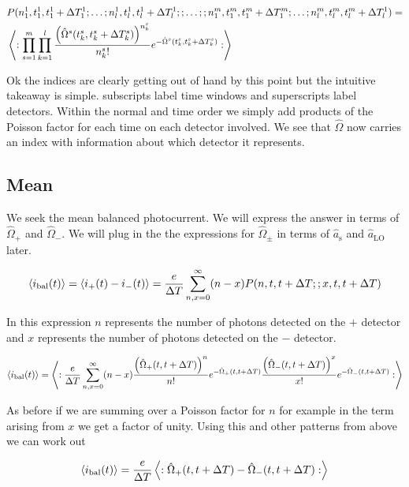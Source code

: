 \documentclass[12pt]{article}
\begin{document}
\begin{align}
&P(n^1_1,t^1_1,t^1_1+\Delta T^1_1;\ldots ;n^1_l,t^1_l,t^1_l+\Delta T^1_l;; \ldots ;; n^m_1,t^m_1,t^m_1+\Delta T^m_1;\ldots ;n^m_l,t^m_l,t^m_l+\Delta T^1_l) =\\ 
&\Braket{:\prod_{s=1}^m \prod_{k=1}^l \frac{\left(\hat{\Omega}^s(t^s_k,t^s_k+\Delta T^s_k)\right)^{n^s_k}}{n^s_k!} e^{-\hat{\Omega}^s(t^s_k,t^s_k+\Delta T^s_k)} :}
\end{align}

Ok the indices are clearly getting out of hand by this point but the intuitive takeaway is simple. subscripts label time windows and superscripts label detectors. Within the normal and time order we simply add products of the Poisson factor for each time on each detector involved. We see that $\hat{\Omega}$ now carries an index with information about which detector it represents.


\subsection{Mean}
We seek the mean balanced photocurrent. We will express the answer in terms of $\hat{\Omega}_+$ and $\hat{\Omega}_-$. We will plug in the the expressions for $\hat{\Omega}_{\pm}$ in terms of $\hat{a}_{\text{s}}$ and $\hat{a}_{\text{LO}}$ later.

\begin{align}
\Braket{i_{\text{bal}}(t)} = \Braket{i_+(t) - i_-(t)} = \frac{e}{\Delta T}\sum_{n,x=0}^{\infty} (n-x) P(n,t,t+\Delta T;;x,t,t+\Delta T)
\end{align}

In this expression $n$ represents the number of photons detected on the $+$ detector and $x$ represents the number of photons detected on the $-$ detector.

\begin{align}
\Braket{i_{\text{bal}}(t)} = \Braket{:\frac{e}{\Delta T}\sum_{n,x=0}^{\infty} (n-x) \frac{\left(\hat{\Omega}_+(t,t+\Delta T)\right)^n}{n!} e^{-\hat{\Omega}_+(t,t+\Delta T)}\frac{\left(\hat{\Omega}_-(t,t+\Delta T)\right)^x}{x!} e^{-\hat{\Omega}_-(t,t+\Delta T)}:}
\end{align}

As before if we are summing over a Poisson factor for $n$ for example in the term arising from $x$ we get a factor of unity. Using this and other patterns from above we can work out

\begin{align}
\Braket{i_{\text{bal}}(t)} = \frac{e}{\Delta T}\Braket{:\hat{\Omega}_+(t,t+\Delta T) - \hat{\Omega}_-(t,t+\Delta T):}
\end{align}
\end{document}
